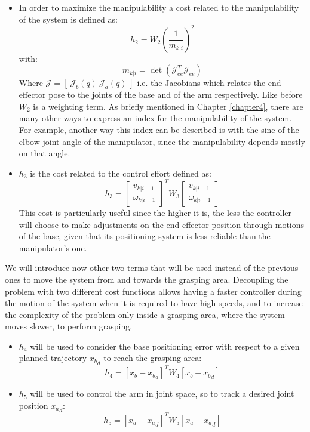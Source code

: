 \begin{itemize}
\item In order to maximize the manipulability a cost related to the manipulability of the system is defined as:
\begin{equation}
h_2 = W_2 \left( \frac{1}{m_{k|i}} \right)^2
\end{equation}
with:
\begin{equation}
m_{k|i} =  \det(\mathcal{J}_{ee}^T\mathcal{J}_{ee})
\end{equation}
Where $\mathcal{J}=[\ \mathcal{J}_b(q)\ \mathcal{J}_a(q)\ ]$ i.e. the Jacobians which relates the end effector pose to the joints of the base and of the arm respectively. Like before $W_2$ is a weighting term. As briefly mentioned in Chapter \ref{chapter4}, there are many other ways to express an index for the manipulability of the system. For example, another way this index can be described is with the sine of the elbow joint angle of the manipulator, since the manipulability depends mostly on that angle.
    
\item $h_3$ is the cost related to the control effort defined as: 
	\begin{equation}
	        h_3=\left[ \begin{matrix} v_{k|i-1} \\ \omega_{k|i-1} \end{matrix}\right]^T W_3 \left[ \begin{matrix} v_{k|i-1} \\ \omega_{k|i-1} \end{matrix}\right]
	 \end{equation}
This cost is particularly useful since the higher it is, the less the controller will choose to make adjustments on the end effector position through motions of the base, given that its positioning system is less reliable than the manipulator's one.
\end{itemize}
We will introduce now other two terms that will be used instead of the previous ones to move the system from and towards the grasping area. Decoupling the problem with two different cost functions allows having a faster controller during the motion of the system when it is required to have high speeds, and to increase the complexity of the problem only inside a grasping area, where the system moves slower, to perform grasping. 
\begin{itemize}
    \item $h_4$ will be used to consider the base positioning error with respect to a given planned trajectory ${x_b}_d$ to reach the grasping area:
        \begin{equation}
            h_4=[x_b-{x_b}_d]^T W_4 [x_b-{x_b}_d]
        \end{equation}
     \item $h_5$ will be used to control the arm in joint space, so to track a desired joint position ${x_a}_d$:
    \begin{equation}
       h_5=[x_a-{x_a}_d]^T W_5 [x_a-{x_a}_d]
    \end{equation}
\end{itemize}
